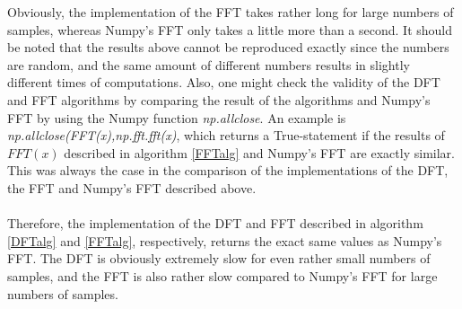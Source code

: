Obviously, the implementation of the FFT takes rather long for large numbers of samples, whereas Numpy's FFT only takes a little more than a second. It should be noted that the results above cannot be reproduced exactly since the numbers are random, and the same amount of different numbers results in slightly different times of computations. Also, one might check the validity of the DFT and FFT algorithms by comparing the result of the algorithms and Numpy's FFT by using the Numpy function \textit{np.allclose}. An example is \textit{np.allclose(FFT(x),np.fft.fft(x)}, which returns a True-statement if the results of $FFT(x)$ described in algorithm \ref{FFTalg} and Numpy's FFT are exactly similar. This was always the case in the comparison of the implementations of the DFT, the FFT and Numpy's FFT described above.
\\ \\
Therefore, the implementation of the DFT and FFT described in algorithm \ref{DFTalg} and \ref{FFTalg}, respectively, returns the exact same values as Numpy's FFT. The DFT is obviously extremely slow for even rather small numbers of samples, and the FFT is also rather slow compared to Numpy's FFT for large numbers of samples.